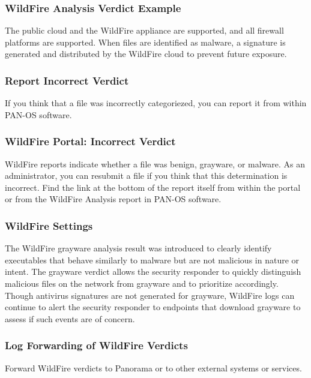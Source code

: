 \subsubsection{WildFire Analysis Verdict Example}
The public cloud and the WildFire appliance are supported, and all firewall platforms are supported.
When files are identified as malware, a signature is generated and distributed by the WildFire cloud to prevent future exposure.

\subsubsection{Report Incorrect Verdict}
If you think that a file was incorrectly categoriezed, you can report it from within PAN-OS software.

\subsubsection{WildFire Portal: Incorrect Verdict}
WildFire reports indicate whether a file was benign, grayware, or malware. As an administrator, you can resubmit a file if you think that this determination is incorrect. 
Find the link at the bottom of the report itself from within the portal or from the WildFire Analysis report in PAN-OS software.

\subsubsection{WildFire Settings}
The WildFire grayware analysis result was introduced to clearly identify executables that behave similarly to malware but are not malicious in nature or intent.
The grayware verdict allows the security responder to quickly distinguish malicious files on the network from grayware and to prioritize accordingly.
Though antivirus signatures are not generated for grayware, WildFire logs can continue to alert the security responder to endpoints that download grayware to assess if such events are of concern.

\subsubsection{Log Forwarding of WildFire Verdicts}
Forward WildFire verdicts to Panorama or to other external systems or services.